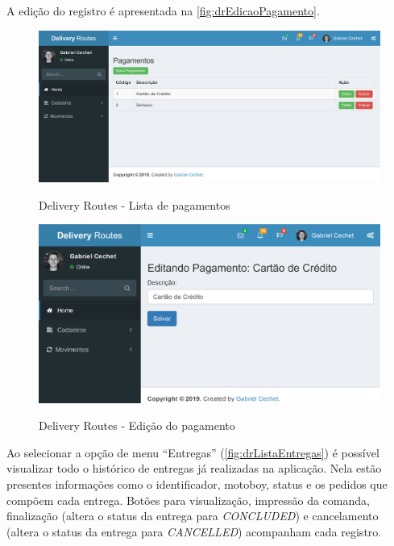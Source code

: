 A edição do registro é apresentada na \autoref{fig:drEdicaoPagamento}.

\begin{figure}[H]
    \centering
    \caption{Delivery Routes - Lista de pagamentos}
    \includegraphics[width=1.0\textwidth]{./dados/figuras/fig20}
    \label{fig:drListaPagamentos}
\end{figure}

\begin{figure}[H]
    \centering
    \caption{Delivery Routes - Edição do pagamento}
    \includegraphics[width=1.0\textwidth]{./dados/figuras/fig21}
    \label{fig:drEdicaoPagamento}
\end{figure}

\newpage
Ao selecionar a opção de menu “Entregas” (\autoref{fig:drListaEntregas}) é possível visualizar todo o histórico de entregas já realizadas na aplicação. Nela estão presentes informações como o identificador, motoboy, status e os pedidos que compõem cada entrega. Botões para visualização, impressão da comanda, finalização (altera o status da entrega para \textit{CONCLUDED}) e cancelamento (altera o status da entrega para \textit{CANCELLED}) acompanham cada registro.

